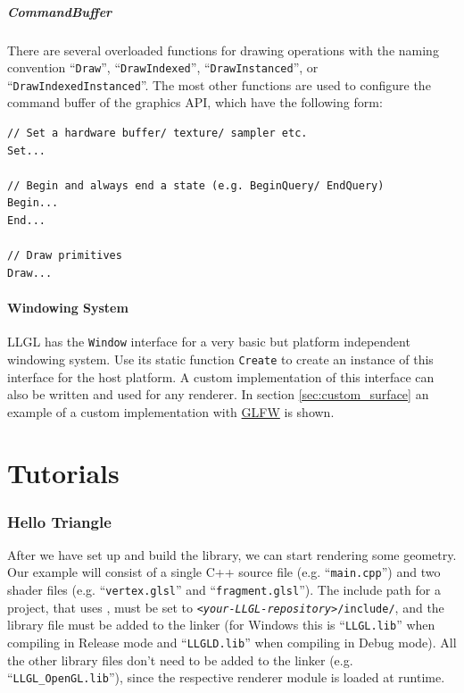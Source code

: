 \documentclass{article}
\begin{document}
\subsubsection{CommandBuffer}

There are several overloaded functions for drawing operations with the naming convention
``\texttt{Draw}'', ``\texttt{DrawIndexed}'', ``\texttt{DrawInstanced}'', or ``\texttt{DrawIndexedInstanced}''.
The most other functions are used to configure the command buffer of the graphics API, which have the following form:
\begin{lstlisting}
// Set a hardware buffer/ texture/ sampler etc.
Set...

// Begin and always end a state (e.g. BeginQuery/ EndQuery)
Begin...
End...

// Draw primitives
Draw...
\end{lstlisting}

\subsection{Windowing System}

LLGL has the \texttt{Window} interface for a very basic but platform independent windowing system.
Use its static function \texttt{Create} to create an instance of this interface for the host platform.
A custom implementation of this interface can also be written and used for any renderer.
In section \ref{sec:custom_surface} an example of a custom implementation with \href{http://www.glfw.org/}{GLFW} is shown.



\newpage
\part{Tutorials}

\section{Hello Triangle}

After we have set up and build the library, we can start rendering some geometry.
Our example will consist of a single C++ source file (e.g. ``\texttt{main.cpp}'') and two shader files
(e.g. ``\texttt{vertex.glsl}'' and ``\texttt{fragment.glsl}'').
The include path for a project, that uses \LLGL, must be set to \texttt{\textit{<your-LLGL-repository>}/include/},
and the \LLGL library file must be added to the linker (for Windows this is ``\texttt{LLGL.lib}''
when compiling in Release mode and ``\texttt{LLGLD.lib}'' when compiling in Debug mode).
All the other library files don't need to be added to the linker (e.g. ``\texttt{LLGL\_OpenGL.lib}''),
since the respective renderer module is loaded at runtime.
\end{document}
